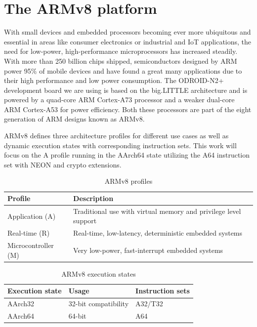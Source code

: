 \section{The ARMv8 platform}

With small devices and embedded processors becoming ever more ubiquitous and
essential in areas like consumer electronics or industrial and IoT
applications, the need for low-power, high-performance microprocessors has
increased steadily. With more than 250 billion chips shipped, semiconductors
designed by ARM power 95\% of mobile devices and have found a great many
applications due to their high performance and low power
consumption\cite{armcompany}. The ODROID-N2+\cite{odroidn2} development board
we are using is based on the big.LITTLE architecture and is powered by a
quad-core ARM Cortex-A73 processor and a weaker dual-core ARM Cortex-A53 for
power efficiency. Both these processors are part of the eight generation of ARM
designs known as ARMv8\cite{armv8:2013}.

ARMv8 defines three architecture profiles for different use cases as well as
dynamic execution states with corresponding instruction sets. This work will
focus on the A profile running in the AArch64 state utilizing the A64
instruction set with NEON and crypto extensions.

\begin{table}[h!]
    \centering
    \caption{ARMv8 profiles}
    \begin{tabularx}{\textwidth}{lX}
        \toprule
        Profile & Description \\
        \midrule
        Application (A) & Traditional use with virtual memory and privilege level support \\
        Real-time (R) & Real-time, low-latency, deterministic embedded systems \\
        Microcontroller (M) & Very low-power, fast-interrupt embedded systems \\
        \bottomrule
    \end{tabularx}
\end{table}

\begin{table}[h!]
    \centering
    \caption{ARMv8 execution states}
    \begin{tabularx}{\textwidth}{llX}
        \toprule
        Execution state & Usage & Instruction sets \\
        \midrule
        AArch32 & 32-bit compatibility & A32/T32 \\
        AArch64 & 64-bit & A64 \\
        \bottomrule
    \end{tabularx}
\end{table}

